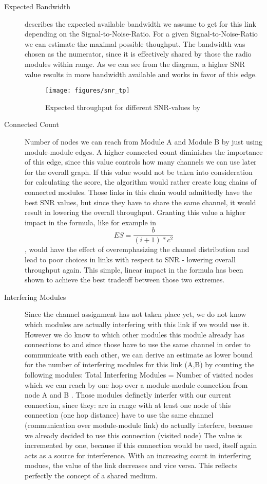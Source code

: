   \begin{description}
    \item[Expected Bandwidth]
    describes the expected available bandwidth we assume to get for this link depending on the Signal-to-Noise-Ratio.
    For a given Signal-to-Noise-Ratio we can estimate the maximal possible thoughput.
    The bandwidth was chosen as the numerator, since it is effectively shared by those the radio modules within range.
    As we can see from the diagram, a higher SNR value results in more bandwidth available and works in favor of this edge.
    \begin{figure}[h]
      \centering
      \texttt{[image: figures/snr\_tp]}
      \caption{Expected throughput for different \ac{SNR}-values by \cite{expected_snr}}
      \label{fig:snr_tp}
    \end{figure}
    \item[Connected Count]
    Number of nodes we can reach from Module A and Module B by just using module-module edges. 
    A higher connected count diminishes the importance of this edge, since this value controls how many channels we can use later for the overall graph.
    If this value would not be taken into consideration for calculating the score, the algorithm would rather create long chains of connected modules. 
    Those links in this chain would admittedly have the best SNR values, but since they have to share the same channel, it would result in lowering the overall throughput.
    Granting this value a higher impact in the formula, like for example in 
    \begin{equation}
      ES=\frac{b}{(i + 1)* c^2}
    \end{equation}
    , would have the effect of overemphasizing 
    the channel distribution and lead to poor choices in links with respect to SNR - lowering overall throughput again.
    This simple, linear impact in the formula has been shown to achieve the best tradeoff between those two extremes.
    \item[Interfering Modules]
    Since the channel assignment has not taken place yet, we do not know which modules are actually interfering with this link if we would use it.
    However we do know to which other modules this module already has connections to and since those have to use the same channel in order to communicate with each
    other, we can derive an estimate as lower bound for the number of interfering modules for this link (A,B) by counting the following modules:
    Total Interfering Modules = Number of visited nodes which we can reach by one hop over a module-module connection from node A and B
    . Those modules definetly interfer with our current connection, since they:
      are in range with at least one node of this connection (one hop distance)
      have to use the same channel (communication over module-module link)
      do actually interfere, because we already decided to use this connection (visited node)
    The value is incremented by one, because if this connection would be used, itself again acts as a source for interference.
    With an increasing count in interfering modues, the value of the link decreases and vice versa. This reflects perfectly the concept of a shared medium.
  \end{description}
